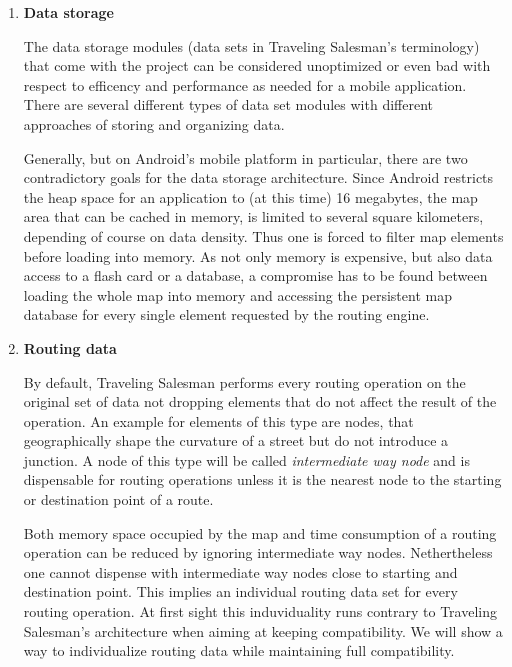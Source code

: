 \begin{enumerate}
	\item \textbf{Data storage}
	
		The data storage modules (data sets in Traveling Salesman's terminology) that come with the project can be considered unoptimized or even bad with respect to efficency and performance as needed for a mobile application. There are several different types of data set modules with different approaches of storing and organizing data.\newline
		
		Generally, but on Android's mobile platform in particular, there are two contradictory goals for the data storage architecture. Since Android restricts the heap space for an application to (at this time) 16 megabytes, the map area that can be cached in memory, is limited to several square kilometers, depending of course on data density. Thus one is forced to filter map elements before loading into memory.
		As not only memory is expensive, but also data access to a flash card or a database, a compromise has to be found between loading the whole map into memory and accessing the persistent map database for every single element requested by the routing engine. \newline
		
	\item \textbf{Routing data}
	
		By default, Traveling Salesman performs every routing operation on the original set of data not dropping elements that do not affect the result of the operation. An example for elements of this type are nodes, that geographically shape the curvature of a street but do not introduce a junction. A node of this type will be called \emph{intermediate way node} and is dispensable for routing operations unless it is the nearest node to the starting or destination point of a route.\newline
		
		Both memory space occupied by the map and time consumption of a routing operation can be reduced by ignoring intermediate way nodes. Nethertheless one cannot dispense with intermediate way nodes close to starting and destination point. This implies an individual routing data set for every routing operation. At first sight this induviduality runs contrary to Traveling Salesman's architecture when aiming at keeping compatibility. We will show a way to individualize routing data while maintaining full compatibility.\newline
											

\end{enumerate}
